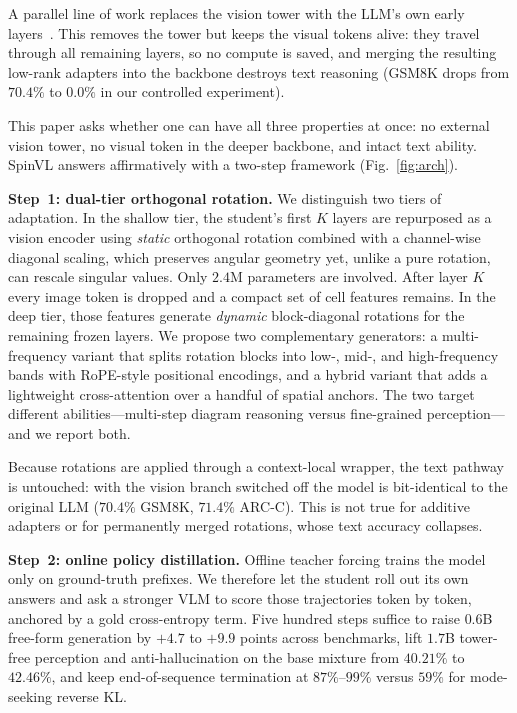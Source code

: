\documentclass[10pt,twocolumn,letterpaper]{article}
\newcommand{\modelname}{SpinVL}
\begin{document}
A parallel line of work replaces the vision tower with the LLM's own early
layers~\citep{vora2025}. This removes the tower but keeps the visual tokens
alive: they travel through all remaining layers, so no compute is saved, and
merging the resulting low-rank adapters into the backbone destroys text
reasoning (GSM8K drops from $70.4\%$ to $0.0\%$ in our controlled experiment).

This paper asks whether one can have all three properties at once: no
external vision tower, no visual token in the deeper backbone, and intact text
ability. \modelname{} answers affirmatively with a two-step framework
(Fig.~\ref{fig:arch}).

\textbf{Step~1: dual-tier orthogonal rotation.} We distinguish two tiers of
adaptation. In the shallow tier, the student's first $K$ layers are
repurposed as a vision encoder using \emph{static} orthogonal rotation
combined with a channel-wise diagonal scaling, which preserves angular
geometry yet, unlike a pure rotation, can rescale singular values. Only
$2.4$M parameters are involved. After layer $K$ every image token is dropped
and a compact set of cell features remains. In the deep tier, those features
generate \emph{dynamic} block-diagonal rotations for the remaining frozen
layers. We propose two complementary generators: a multi-frequency variant
that splits rotation blocks into low-, mid-, and high-frequency bands with
RoPE-style positional encodings, and a hybrid variant that adds a lightweight
cross-attention over a handful of spatial anchors. The two target different
abilities---multi-step diagram reasoning versus fine-grained perception---and
we report both.

Because rotations are applied through a context-local wrapper, the text
pathway is untouched: with the vision branch switched off the model is
bit-identical to the original LLM ($70.4\%$ GSM8K, $71.4\%$ ARC-C). This is
not true for additive adapters or for permanently merged rotations, whose text
accuracy collapses.

\textbf{Step~2: online policy distillation.} Offline teacher forcing trains
the model only on ground-truth prefixes. We therefore let the student roll out
its own answers and ask a stronger VLM to score those trajectories token by
token, anchored by a gold cross-entropy term. Five hundred steps suffice to
raise $0.6$B free-form generation by $+4.7$ to $+9.9$ points across benchmarks,
lift $1.7$B tower-free perception and anti-hallucination on the base mixture from
$40.21\%$ to $42.46\%$, and keep end-of-sequence termination at $87\%$--$99\%$
versus $59\%$ for mode-seeking reverse KL.
\end{document}
